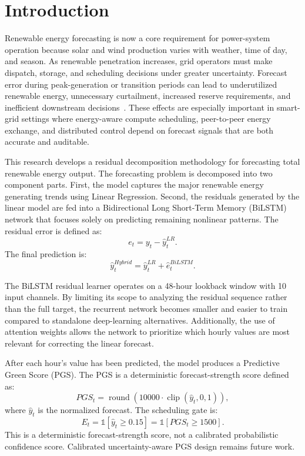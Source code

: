 \documentclass{ieeeaccess}
\begin{document}
\maketitle

\section{Introduction}
Renewable energy forecasting is now a core requirement for power-system operation because solar and wind production varies with weather, time of day, and season. As renewable penetration increases, grid operators must make dispatch, storage, and scheduling decisions under greater uncertainty. Forecast error during peak-generation or transition periods can lead to underutilized renewable energy, unnecessary curtailment, increased reserve requirements, and inefficient downstream decisions~\cite{kroposki,pinson,voyant,denholm,lund,hong}. These effects are especially important in smart-grid settings where energy-aware compute scheduling, peer-to-peer energy exchange, and distributed control depend on forecast signals that are both accurate and auditable.

This research develops a residual decomposition methodology for forecasting total renewable energy output. The forecasting problem is decomposed into two component parts. First, the model captures the major renewable energy generating trends using Linear Regression. Second, the residuals generated by the linear model are fed into a Bidirectional Long Short-Term Memory (BiLSTM) network that focuses solely on predicting remaining nonlinear patterns. The residual error is defined as:
\begin{equation}
e_t = y_t - \hat{y}^{LR}_t .
\end{equation}
The final prediction is:
\begin{equation}
\hat{y}^{Hybrid}_t = \hat{y}^{LR}_t + \hat{e}^{BiLSTM}_t .
\end{equation}

The BiLSTM residual learner operates on a 48-hour lookback window with 10 input channels. By limiting its scope to analyzing the residual sequence rather than the full target, the recurrent network becomes smaller and easier to train compared to standalone deep-learning alternatives. Additionally, the use of attention weights allows the network to prioritize which hourly values are most relevant for correcting the linear forecast.

After each hour's value has been predicted, the model produces a Predictive Green Score (PGS). The PGS is a deterministic forecast-strength score defined as:
\begin{equation}
PGS_t = \operatorname{round}\left(10000 \cdot \operatorname{clip}(\hat{y}_t,0,1)\right),
\end{equation}
where $\hat{y}_t$ is the normalized forecast. The scheduling gate is:
\begin{equation}
E_t = \mathbb{1}[\hat{y}_t \ge 0.15] = \mathbb{1}[PGS_t \ge 1500].
\end{equation}
This is a deterministic forecast-strength score, not a calibrated probabilistic confidence score. Calibrated uncertainty-aware PGS design remains future work.
\end{document}

